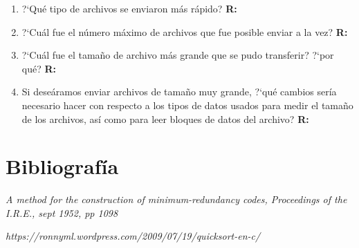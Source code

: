 \documentclass[12pt,twoside]{article}
\begin{document}
\begin{enumerate}
\item ?`Qu\'e tipo de archivos se enviaron m\'as r\'apido?
\newline \textbf{R:}

\item ?`Cu\'al fue el n\'umero m\'aximo de archivos que fue posible enviar a la vez?
\newline \textbf{R:}

\item ?`Cu\'al fue el tama\~no de archivo m\'as grande que se pudo transferir? ?`por qu\'e?
\newline \textbf{R:}

\item Si dese\'aramos enviar archivos de tama\~no muy grande, ?`qu\'e cambios ser\'ia necesario hacer con respecto a los tipos de datos usados para medir el tama\~no de los archivos, as\'i como para leer bloques de datos del archivo?
\newline \textbf{R:}


\end{enumerate}

\section{Bibliograf\'ia}
\begin{thebibliography}{X}	
  \textit{A method for the construction of minimum-redundancy codes, Proceedings of the I.R.E., sept 1952, pp 1098}

 \textit{https://ronnyml.wordpress.com/2009/07/19/quicksort-en-c/}
\end{thebibliography}
\end{document}
